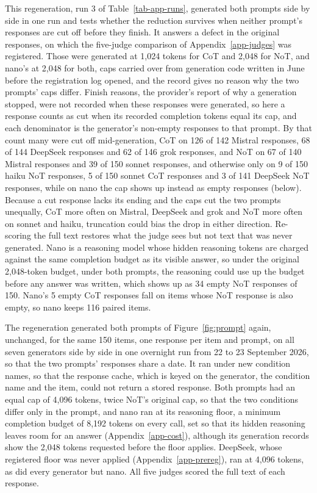 This regeneration, run 3 of Table~\ref{tab-app-runs}, generated both prompts
side by side in one run and tests whether the reduction survives when neither
prompt's responses are cut off before they finish. It answers a defect in the
original responses, on which the five-judge comparison of
Appendix~\ref{app-judges} was registered. Those were generated at 1,024
tokens for CoT and 2,048 for NoT, and nano's at 2,048 for both, caps carried
over from generation code written in June before the registration log opened,
and the record gives no reason why the two prompts' caps differ.
Finish reasons, the provider's report of why a generation stopped, were not
recorded when these responses were generated, so here
a response counts as cut when its recorded completion tokens equal its cap,
and each denominator is the generator's non-empty responses to that prompt.
By that count many were cut off mid-generation, CoT on 126 of 142 Mistral
responses, 68 of 144 DeepSeek responses and 62 of 146 grok responses, and NoT
on 67 of 140 Mistral responses and 39 of 150 sonnet responses, and otherwise
only on 9 of 150 haiku NoT responses, 5 of 150 sonnet CoT responses and 3 of
141 DeepSeek NoT responses, while on nano the cap shows up instead as empty
responses (below).
Because a cut response lacks its ending and the caps cut the two prompts
unequally, CoT more often on Mistral, DeepSeek and grok and NoT more often on
sonnet and haiku, truncation could bias the drop in either direction.
Re-scoring the full text restores what the judge sees but not text that was
never generated. Nano is a reasoning model whose hidden reasoning tokens are
charged against the same completion budget as its visible answer, so under
the original 2,048-token budget, under both prompts, the reasoning could use
up the budget before any answer was written, which shows up as 34 empty NoT
responses of 150.
Nano's 5 empty CoT responses fall on items whose NoT response is also empty,
so nano keeps 116 paired items.

The regeneration generated both prompts of Figure~\ref{fig:prompt} again,
unchanged, for the same 150 items, one response per item and prompt, on all
seven generators side by side in one overnight run from 22 to 23 September
2026, so that the two prompts' responses share a date.
It ran under new condition names, so that the response cache, which is keyed
on the generator, the condition name and the item, could not return a stored
response.
Both prompts had an equal cap of 4,096 tokens, twice NoT's original cap, so
that the two conditions differ only in the prompt, and nano ran at its
reasoning floor, a minimum completion budget of 8,192 tokens on every call,
set so that its hidden reasoning leaves room for an answer
(Appendix~\ref{app-cost}), although its generation records show the 2,048
tokens requested before the floor applies.
DeepSeek, whose registered floor was never applied (Appendix~\ref{app-prereg}),
ran at 4,096 tokens, as did every generator but nano.
All five judges scored the full text of each response.

